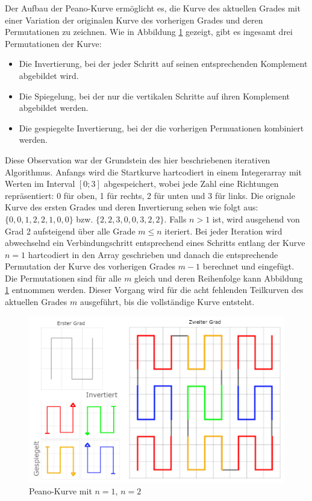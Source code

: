 \documentclass[course=asp]{aspdoc}
\begin{document}
Der Aufbau der Peano-Kurve erm\"oglicht es, die Kurve des aktuellen Grades mit einer Variation der originalen Kurve des vorherigen Grades und deren Permutationen zu zeichnen. Wie in Abbildung \ref{Abb:Peano L\"osungsidee} gezeigt, gibt es ingesamt drei Permutationen der Kurve:

\begin{itemize}
    \item Die Invertierung, bei der jeder Schritt auf seinen entsprechenden Komplement abgebildet wird.
    \item Die Spiegelung, bei der nur die vertikalen Schritte auf ihren Komplement abgebildet werden.
    \item Die gespiegelte Invertierung, bei der die vorherigen Permuationen kombiniert werden.
\end{itemize}

Diese Observation war der Grundstein des hier beschriebenen iterativen Algorithmus. Anfangs wird die Startkurve hartcodiert in einem Integerarray mit Werten im Interval $[0;3]$ abgespeichert, wobei jede Zahl eine Richtungen repr\"asentiert: 0 f\"ur oben, 1 f\"ur rechts, 2 f\"ur unten und 3 f\"ur links. Die orignale Kurve des ersten Grades und deren Invertierung sehen wie folgt aus: $\{0, 0, 1, 2, 2, 1, 0, 0\}$ bzw. $\{2, 2, 3, 0, 0, 3, 2, 2\}$. 
Falls $n > 1$ ist, wird ausgehend von Grad 2 aufsteigend \"uber alle Grade $m \leq n$ iteriert. Bei jeder Iteration wird abwechselnd ein Verbindungschritt entsprechend eines Schritts entlang der Kurve $n = 1$ hartcodiert in den Array geschrieben und danach die entsprechende Permutation der Kurve des vorherigen Grades $m - 1$ berechnet und eingef\"ugt. Die Permutationen sind f\"ur alle $m$ gleich und deren Reihenfolge kann Abbildung \ref{Abb:Peano L\"osungsidee} entnommen werden. Dieser Vorgang wird f\"ur die acht fehlenden Teilkurven des aktuellen Grades $m$ ausgef\"uhrt, bis die vollst\"andige Kurve entsteht.

\begin{figure}[ht]
\centering
\includegraphics[scale=0.3]{PeanoFarbcodiert.png}
\caption{Peano-Kurve mit $n = 1$, $n = 2$}\label{Abb:Peano L\"osungsidee}
\captionsetup[figure]{font=small,labelfont=small}
\end{figure}
\end{document}

